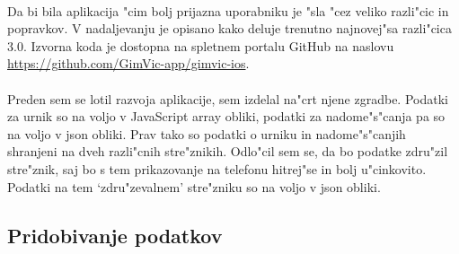 \paragraph{}Da bi bila aplikacija "cim bolj prijazna uporabniku je "sla "cez veliko razli"cic in popravkov. V nadaljevanju je opisano kako deluje trenutno najnovej"sa razli"cica 3.0. Izvorna koda je dostopna na spletnem portalu GitHub na naslovu \url{https://github.com/GimVic-app/gimvic-ios}.

\paragraph{}Preden sem se lotil razvoja aplikacije, sem izdelal na"crt njene zgradbe. Podatki za urnik so na voljo v JavaScript array obliki, podatki za nadome"s"canja pa so na voljo v json obliki. Prav tako so podatki o urniku in nadome"s"canjih shranjeni na dveh razli"cnih stre"znikih. Odlo"cil sem se, da bo podatke zdru"zil stre"znik, saj bo s tem prikazovanje na telefonu hitrej"se in bolj u"cinkovito. Podatki na tem `zdru"zevalnem' stre"zniku so na voljo v json obliki.

\subsection{Pridobivanje podatkov} 
